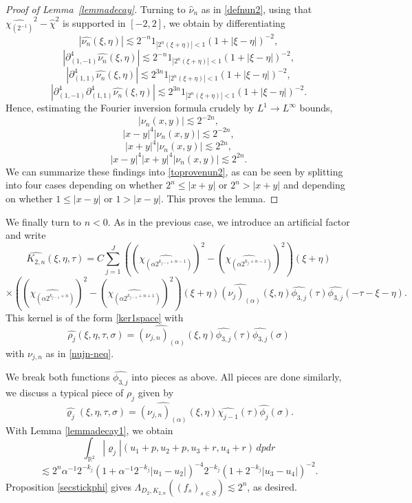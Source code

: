 \documentclass[12pt,reqno]{amsart}
\theoremstyle{plain}
\theoremstyle{definition}
\numberwithin{equation}{section}
\newcommand{\R}{{\mathbb R}}
\begin{document}
\begin{proof}[Proof of Lemma~\ref{lemmadecay}]
Turning to $\widehat{\nu}_n$ as in \eqref{defnun2}, using that
$\widehat{\chi_{( 2^{-1})}}^2-\widehat{\chi}^2$ is supported in $[-2,2]$, we obtain
by differentiating
 \[|\widehat{\nu_{n}}(\xi,\eta)| 
 \lesssim 2^{-n} 1_{|2^n(\xi+\eta)| <1} (1+|\xi-\eta|)^{-2},\]
 \[|\partial_{(1,-1)}^4  \widehat{\nu_n}(\xi,\eta)|
 \lesssim 2^{-n} 1_{|2^n(\xi+\eta)| <1} (1+|\xi-\eta|)^{-2},\]
 \[|\partial_{(1,1)}^4 \widehat{\nu_n}(\xi,\eta)|
 \lesssim 2^{3n} 1_{|2^n(\xi+\eta)| <1} (1+|\xi-\eta|)^{-2},\]
 \[|\partial_{(1,-1)}^4\partial_{(1,1)}^4 \widehat{\nu_n}(\xi,\eta)|
 \lesssim 2^{3n} 1_{|2^n(\xi+\eta)| <1} (1+|\xi-\eta|)^{-2}.\]
Hence, estimating the  Fourier inversion formula crudely by $L^1\to L^\infty$ bounds,
$$|{\nu_n}(x,y)|\lesssim 2^{-2n},$$
$$|x-y|^4 |{\nu_n}(x,y)|\lesssim 2^{-2n},$$
$$|x+y|^4 |{\nu_n}(x,y)|\lesssim 2^{2n},$$
$$|x-y|^4 |x+y|^4 |{\nu_n}(x,y)|\lesssim 2^{2n}.$$
We can summarize these findings into \eqref{toprovenun2},
as can be seen by splitting into four cases
depending on whether $2^n\le |x+y|$ or $2^n> |x+y|$
and depending on whether
$1\le |x-y|$ or $1> |x-y|$. This proves the lemma.
\end{proof}

We finally turn to $n<0$. As in the previous case,
we introduce an artificial factor and write  
\[\widehat{K_{2,n}}(\xi,\eta,\tau) = C\sum_{j=1}^J ((\widehat{\chi_{(\alpha 2^{k_{j-1}+n-1})}})^2-(\widehat{\chi_{(\alpha 2^{k_{j}+n-1})}})^2)(\xi+\eta) \]
\[ \times 
((\widehat{\chi_{(\alpha 2^{k_{j-1}+n})}})^2-(\widehat{\chi_{(\alpha 2^{k_{j-1}+n+1})}})^2)(\xi+\eta)
\widehat{(\nu_j)_{(\alpha)}}(\xi,\eta)\widehat{\phi_{3,j}}(\tau)\widehat{\phi_{3,j}}(-\tau-\xi-\eta).
\]
This kernel is of the form \eqref{ker1space} with
$$\widehat{\rho_j}(\xi,\eta,\tau, \sigma)=
\widehat{(\nu_{j,n})_{(\alpha)}}(\xi,\eta)\widehat{\phi_{3,j}}(\tau)\widehat{\phi_{3,j}}(\sigma)
$$
with $\nu_{j,n}$ as in \eqref{nujn-neq}.
 
We break both functions $\widehat{\phi_{3,j}}$ into pieces as above.
All pieces are done similarly, we discuss a typical piece of $\rho_j$ given by
$$\widehat{\varrho_j}(\xi,\eta,\tau, \sigma)=
\widehat{(\nu_{j,n})_{(\alpha)}}(\xi,\eta)\widehat{\chi_{j-1}}(\tau)\widehat{\phi_{j}}(\sigma) .
$$
With  Lemma \ref{lemmadecay1}, we obtain
\[\int_{\R^2}|\varrho_j|(u_1+p,u_2+p,u_3+r,u_4+r)\, dpdr\]
\[\lesssim 2^{n} \alpha^{-1} 2^{- k_{j}}(1+\alpha^{-1} 2^{- k_{j}} 
|u_1-u_2|)^{-4}2^{-k_{j}}(1+2^{-k_{j}}|u_3-u_4|)^{-2}.\]
Proposition \ref{secstickphi} gives $\Lambda_{D_2,K_{2,n}}((f_s)_{s\in S})\lesssim 2^{n}$, as desired.
\end{document}
